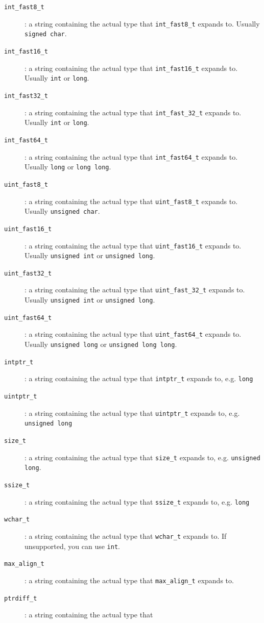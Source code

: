\begin{description}
\item[\texttt{int\_fast8\_t}]: a string containing the actual type that
  \verb+int_fast8_t+ expands to. Usually \verb+signed char+.
\item[\texttt{int\_fast16\_t}]: a string containing the actual type that
  \verb+int_fast16_t+ expands to. Usually \verb+int+ or \verb+long+.
\item[\texttt{int\_fast32\_t}]: a string containing the actual type that
  \verb+int_fast_32_t+ expands to. Usually \verb+int+ or \verb+long+.
\item[\texttt{int\_fast64\_t}]: a string containing the actual type that
  \verb+int_fast64_t+ expands to. Usually \verb+long+ or \verb+long long+.
\item[\texttt{uint\_fast8\_t}]: a string containing the actual type that
  \verb+uint_fast8_t+ expands to. Usually \verb+unsigned char+.
\item[\texttt{uint\_fast16\_t}]: a string containing the actual type that
  \verb+uint_fast16_t+ expands to. Usually \verb+unsigned int+ or \verb+unsigned long+.
\item[\texttt{uint\_fast32\_t}]: a string containing the actual type that
  \verb+uint_fast_32_t+ expands to. Usually \verb+unsigned int+ or \verb+unsigned long+.
\item[\texttt{uint\_fast64\_t}]: a string containing the actual type that
  \verb+uint_fast64_t+ expands to. Usually \verb+unsigned long+ or
  \verb+unsigned long long+.
\item[\texttt{intptr\_t}]: a string containing the actual type that
  \verb+intptr_t+ expands to, e.g. \verb+long+
\item[\texttt{uintptr\_t}]: a string containing the actual type that
  \verb+uintptr_t+ expands to, e.g. \verb+unsigned long+
\item[\texttt{size\_t}]: a string containing the actual type that
  \verb+size_t+ expands to, e.g. \verb+unsigned long+.
\item[\texttt{ssize\_t}]: a string containing the actual type that
  \verb+ssize_t+ expands to, e.g. \verb+long+
\item[\texttt{wchar\_t}]: a string containing the actual type that
  \verb+wchar_t+ expands to. If unsupported, you can use \verb+int+.
\item[\texttt{max\_align\_t}]: a string containing the actual type that
  \verb+max_align_t+ expands to.
\item[\texttt{ptrdiff\_t}]: a string containing the actual type that

\end{description}
